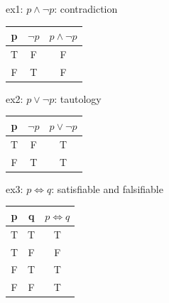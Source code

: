 \documentclass{article}
\begin{document}
ex1: $p \land \lnot p$: contradiction
\begin{table}[h]
    \begin{center}
        \begin{tabular}{c|c|c}
            p & $\lnot p$ & $p \land \lnot p$ \\
            \hline
            T & F         & F                 \\
            F & T         & F
        \end{tabular}
    \end{center}
\end{table}

ex2: $p \lor \lnot p$: tautology
\begin{table}[h!]
    \begin{center}
        \begin{tabular}{|c|c|c|}
            \hline
            p & $\lnot p$ & $p \lor \lnot p$ \\
            \hline\hline
            T & F         & T                \\
            F & T         & T                \\
            \hline
        \end{tabular}
    \end{center}
\end{table}

ex3: $p \iff q$: satisfiable and falsifiable
\begin{table}[h!]
    \begin{center}
        \begin{tabular}{|c|c|c|}
            \hline
            p & q & $p \iff q$ \\
            \hline\hline
            T & T & T          \\
            T & F & F          \\
            F & T & T          \\
            F & F & T          \\
            \hline
        \end{tabular}
    \end{center}
\end{table}
\end{document}

